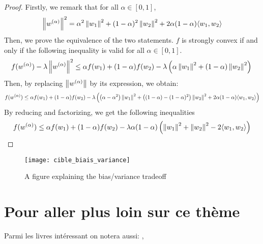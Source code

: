 \documentclass{article}
\begin{document}
\begin{proof}
Firstly, we remark that for all $\alpha \in [0,1]$,
$$ \left \lVert w^{(\alpha)} \right \rVert^2 = \alpha^2\left \lVert w_1 \right \rVert^2 + (1-\alpha)^2\left \lVert w_2 \right \rVert^2 + 2 \alpha (1-\alpha) \langle {w_1}, {w_2} \rangle$$
Then, we prove the equivalence of the two statements.
$f$ is strongly convex if and only if the following inequality is valid for all $\alpha \in [0,1]$.
\begin{equation*}
f(w^{(\alpha)}) - \lambda \left \lVert w^{(\alpha)} \right \rVert^2 \leq  \alpha f(w_1) + (1-\alpha) f(w_2) - \lambda \left( \alpha \left \lVert w_1 \right \rVert^2 + (1-\alpha)\left \lVert w_2 \right \rVert^2\right)\\
\end{equation*}
Then, by replacing $\left \lVert w^{(\alpha)} \right \rVert$ by its expression, we obtain:
\begin{equation*}
f(w^{(\alpha)}) \leq \alpha f(w_1) + (1-\alpha) f(w_2) -
 \lambda \left( \left(\alpha-\alpha^2\right) \left \lVert w_1 \right \rVert^2 +\left((1-\alpha)-(1-\alpha)^2\right)\left \lVert w_2 \right \rVert^2 + 2 \alpha(1-\alpha)\langle {w_1}, {w_2} \rangle\right)
\end{equation*}
By reducing and factorizing, we get the following inequalities
\begin{equation*}
f(w^{(\alpha)}) \leq \alpha f(w_1) + (1-\alpha) f(w_2) -
 \lambda \alpha (1-\alpha) \left( \left \lVert w_1 \right \rVert^2 +\left \lVert w_2 \right \rVert^2 - 2 \langle {w_1}, {w_2} \rangle\right)
\end{equation*}
\end{proof}

\begin{figure}[htbp]
  \centering
  \texttt{[image: cible\_biais\_variance]}
  \caption{A figure explaining the bias/variance tradeoff}
  \label{fig:my_nice_figure}
\end{figure}


\section{Pour aller plus loin sur ce thème}
\label{sec:pour_aller_plus_loin_sur_ce_theme}

Parmi les livres intéressant on notera aussi:
\cite{Boyd_Vandenberghe04}, \cite{Beck17}




\end{document}

